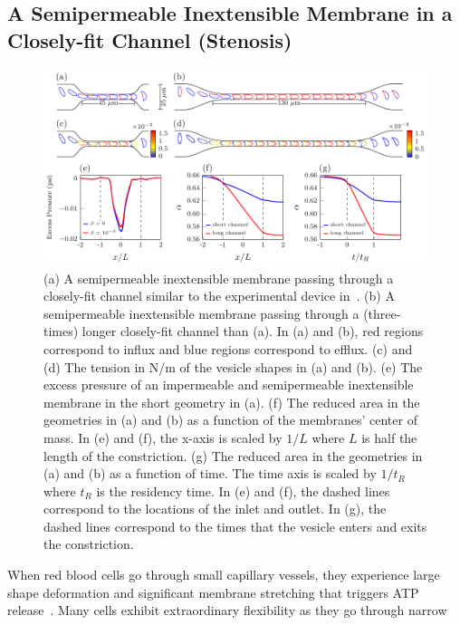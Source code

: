 \documentclass[prb,preprint,showpacs,preprintnumbers,amsmath,amssymb,longbibliography]{revtex4-1}
\newif\ifTikz
\begin{document}
\subsection{A Semipermeable Inextensible Membrane in a Closely-fit Channel (Stenosis)}
\begin{figure}[htp]
  \centering
  \ifTikz
  
  \else
  \includegraphics{figures/stenosisComposite.pdf}
  \fi
  \caption{\label{fig:stenosisComposite} (a) A semipermeable
  inextensible membrane passing through a closely-fit channel similar to
  the experimental device in~\citet{abk-fai-sto2006}. (b) A
  semipermeable inextensible membrane passing through a (three-times)
  longer closely-fit channel than (a). In (a) and (b), red regions
  correspond to influx and blue regions correspond to efflux. (c) and
  (d) The tension in N/m of the vesicle shapes in (a) and (b). (e) The
  excess pressure of an impermeable and semipermeable inextensible
  membrane in the short geometry in (a). (f) The reduced area in the
  geometries in (a) and (b) as a function of the membranes' center of
  mass. In (e) and (f), the x-axis is scaled by $1/L$ where $L$ is half
  the length of the constriction. (g) The reduced area in the geometries
  in (a) and (b) as a function of time. The time axis is scaled by
  $1/t_R$ where $t_R$ is the residency time. In (e) and (f), the dashed
  lines correspond to the locations of the inlet and outlet. In (g), the
  dashed lines correspond to the times that the vesicle enters and exits
  the constriction.}
\end{figure}
When red blood cells go through small capillary vessels, they experience
large shape deformation and significant membrane stretching that
triggers ATP release~\cite{Wan2008_PNAS, ForsythWan2011_PNAS}. Many
cells exhibit extraordinary flexibility as they go through narrow
\end{document}
